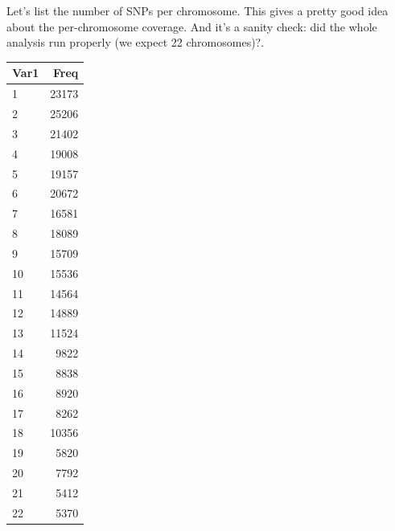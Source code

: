 \documentclass[
]{book}
\newenvironment{Shaded}{\begin{snugshade}}{\end{snugshade}}
\newcommand{\CommentTok}[1]{\textcolor[rgb]{0.56,0.35,0.01}{\textit{#1}}}
\newcommand{\FunctionTok}[1]{\textcolor[rgb]{0.00,0.00,0.00}{#1}}
\newcommand{\NormalTok}[1]{#1}
\newcommand{\SpecialCharTok}[1]{\textcolor[rgb]{0.00,0.00,0.00}{#1}}
\newcommand{\StringTok}[1]{\textcolor[rgb]{0.31,0.60,0.02}{#1}}
\begin{document}
Let's list the number of SNPs per chromosome. This gives a pretty good idea about the per-chromosome coverage. And it's a sanity check: did the whole analysis run properly (we expect 22 chromosomes)?.

\begin{Shaded}
\end{Shaded}

\begin{tabular}{l|r}
\hline
Var1 & Freq\\
\hline
1 & 23173\\
\hline
2 & 25206\\
\hline
3 & 21402\\
\hline
4 & 19008\\
\hline
5 & 19157\\
\hline
6 & 20672\\
\hline
7 & 16581\\
\hline
8 & 18089\\
\hline
9 & 15709\\
\hline
10 & 15536\\
\hline
11 & 14564\\
\hline
12 & 14889\\
\hline
13 & 11524\\
\hline
14 & 9822\\
\hline
15 & 8838\\
\hline
16 & 8920\\
\hline
17 & 8262\\
\hline
18 & 10356\\
\hline
19 & 5820\\
\hline
20 & 7792\\
\hline
21 & 5412\\
\hline
22 & 5370\\
\hline
\end{tabular}
\end{document}
